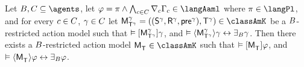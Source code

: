 \begin{lemma}\label{aaml-k-covers}
Let $\agentsB, \agentsC \subseteq \agents$, 
let $\phi = \pi \land \bigwedge_{\agentC \in \agentsC} \coverC \Gamma_\agentC \in \langAaml$ where $\pi \in \langPl$, and 
for every $\agentC \in \agentsC$, $\gamma \in \agentsC$
let $\aPModelAndTuple[\gamma]{\aStatesT[\gamma]} \in \classAmK$ be a $\agentsB$-restricted action model such that 
$\entails \actionA{\aPModel[\gamma]{\aStatesT[\gamma]}} \gamma$, and 
$\entails \actionE{\aPModel[\gamma]{\aStatesT[\gamma]}} \gamma \iff \someactsBs \gamma$.
Then there exists a $\agentsB$-restricted action model $\aPModel{\aStatesT} \in \classAmK$ such that 
$\entails \actionA{\aPModel{\aStatesT}} \phi$, and 
$\entails \actionE{\aPModel{\aStatesT}} \phi \iff \someactsBs \phi$.
\end{lemma}

